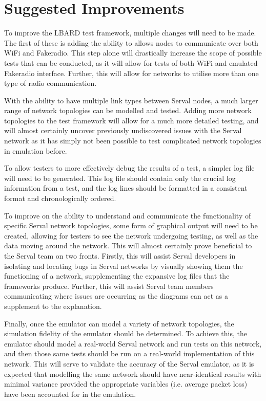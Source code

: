 \section{Suggested Improvements}
To improve the LBARD test framework, multiple changes will need to be made.
The first of these is adding the ability to allows nodes to communicate over both WiFi and Fakeradio.
This step alone will drastically increase the scope of possible tests that can be conducted, as it will allow for tests of both WiFi and emulated Fakeradio interface.
Further, this will allow for networks to utilise more than one type of radio communication.

With the ability to have multiple link types between Serval nodes, a much larger range of network topologies can be modelled and tested.
Adding more network topologies to the test framework will allow for a much more detailed testing, and will almost certainly uncover previously undiscovered issues with the Serval network as it has simply not been possible to test complicated network topologies in emulation before.

To allow testers to more effectively debug the results of a test, a simpler log file will need to be generated.
This log file should contain only the crucial log information from a test, and the log lines should be formatted in a consistent format and chronologically ordered.

To improve on the ability to understand and communicate the functionality of specific Serval network topologies, some form of graphical output will need to be created, allowing for testers to see the network undergoing testing, as well as the data moving around the network.
This will almost certainly prove beneficial to the Serval team on two fronts. 
Firstly, this will assist Serval developers in isolating and locating bugs in Serval networks by visually showing them the functioning of a network, supplementing the expansive log files that the frameworks produce.
Further, this will assist Serval team members communicating where issues are occurring as the diagrams can act as a supplement to the explanation.

Finally, once the emulator can model a variety of network topologies, the simulation fidelity of the emulator should be determined.
To achieve this, the emulator should model a real-world Serval network and run tests on this network, and then those same tests should be run on a real-world implementation of this network.
This will serve to validate the accuracy of the Serval emulator, as it is expected that modelling the same network should have near-identical results with minimal variance provided the appropriate variables (i.e. average packet loss) have been accounted for in the emulation.

